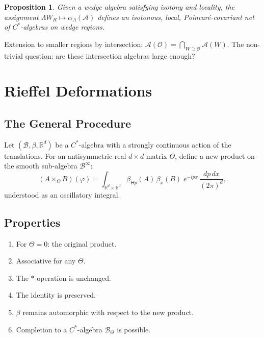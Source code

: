 \documentclass[11pt,a4paper]{article}
\newtheorem{proposition}{Proposition}[section]
\begin{document}
\begin{proposition}
Given a wedge algebra satisfying isotony and locality, the assignment
$\Lambda W_R \mapsto \alpha_\Lambda(\mathcal{A})$ defines an isotonous,
local, Poincar\'e-covariant net of $C^*$-algebras on wedge regions.
\end{proposition}

Extension to smaller regions by intersection:
$\mathcal{A}(\mathcal{O}) = \bigcap_{W \supset \mathcal{O}} \mathcal{A}(W)$.
The non-trivial question: are these intersection algebras large enough?

\section{Rieffel Deformations}

\subsection{The General Procedure}

Let $(\mathcal{B}, \beta, \mathbb{R}^d)$ be a $C^*$-algebra with a
strongly continuous action of the translations. For an antisymmetric
real $d \times d$ matrix $\Theta$, define a new product on the smooth
sub-algebra $\mathcal{B}^\infty$:
\begin{equation}
  (A \times_\Theta B)(\varphi) = \int_{\mathbb{R}^d \times \mathbb{R}^d}
  \beta_{\Theta p}(A)\, \beta_x(B)\;
  e^{-ipx}\, \frac{dp\, dx}{(2\pi)^d},
\end{equation}
understood as an oscillatory integral.

\subsection{Properties}

\begin{enumerate}[nosep]
  \item For $\Theta = 0$: the original product.
  \item Associative for any $\Theta$.
  \item The $*$-operation is unchanged.
  \item The identity is preserved.
  \item $\beta$ remains automorphic with respect to the new product.
  \item Completion to a $C^*$-algebra $\mathcal{B}_\Theta$ is possible.
\end{enumerate}
\end{document}
